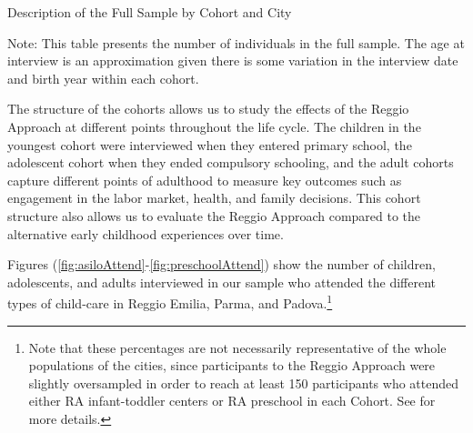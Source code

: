 \documentclass[12pt]{article}
\begin{document}
\begin{table}[H]
\centering
\begin{threeparttable}
	\caption{Description of the Full Sample by Cohort and City}\label{tab:sample-city-cohort}
	
\begin{tablenotes}
\footnotesize
Note: This table presents the number of individuals in the full sample. The age at interview is an approximation given there is some variation in the interview date and birth year within each cohort.
\end{tablenotes}
\end{threeparttable}
\end{table}

\begin{table}[H]
\centering
{}
\end{table}

The structure of the cohorts allows us to study the effects of the Reggio Approach at different points throughout the life cycle. The children in the youngest cohort were interviewed when they entered primary school, the adolescent cohort when they ended compulsory schooling, and the adult cohorts capture different points of adulthood to measure key outcomes such as engagement in the labor market, health, and family decisions. This cohort structure also allows us to evaluate the Reggio Approach compared to the alternative early childhood experiences over time.

Figures (\ref{fig:asiloAttend}-\ref{fig:preschoolAttend}) show the number of children, adolescents, and adults interviewed in our sample who attended the different types of child-care in Reggio Emilia, Parma, and Padova.\footnote{Note that these percentages are not necessarily representative of the whole populations of the cities, since participants to the Reggio Approach were slightly oversampled in order to reach at least 150 participants who attended either RA infant-toddler centers or RA preschool in each Cohort. See \citep{Biroli2015} for more details.}
\end{document}
